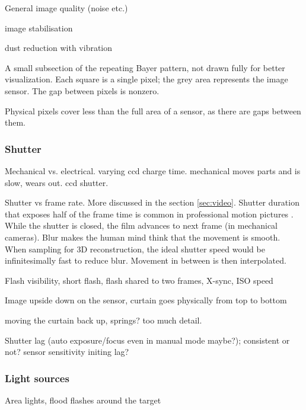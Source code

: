 General image quality (noise etc.)

image stabilisation

dust reduction with vibration


{A small subsection of the repeating Bayer pattern, not drawn fully for better visualization. Each square is a single pixel; the grey area represents the image sensor. The gap between pixels is nonzero.}

Physical pixels cover less than the full area of a sensor, as there are gaps between them.


\subsubsection{Shutter} %

Mechanical vs. electrical. varying ccd charge time. mechanical moves parts and is slow, wears out. ccd shutter.

Shutter vs frame rate. More discussed in the section \ref{sec:video}. Shutter duration that exposes half of the frame time is common in professional motion pictures \cite{wilson2004anton}. While the shutter is closed, the film advances to next frame (in mechanical cameras). Blur makes the human mind think that the movement is smooth. When sampling for 3D reconstruction, the ideal shutter speed would be infinitesimally fast to reduce blur. Movement in between is then interpolated.

Flash visibility, short flash, flash shared to two frames, X-sync, ISO speed

Image upside down on the sensor, curtain goes physically from top to bottom

moving the curtain back up, springs? too much detail.

Shutter lag (auto exposure/focus even in manual mode maybe?); consistent or not? sensor sensitivity initing lag?


\subsubsection{Light sources} %

Area lights, flood flashes around the target

